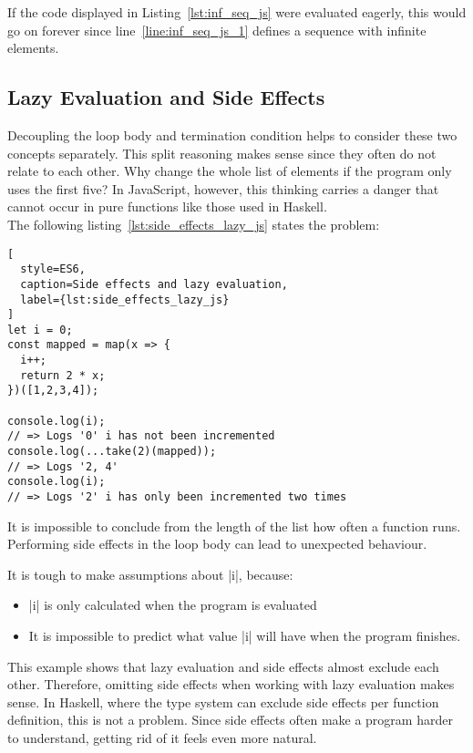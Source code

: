If the code displayed in Listing~\ref{lst:inf_seq_js} were evaluated eagerly,
this would go on forever since line~\ref{line:inf_seq_js_1} defines a sequence
with infinite elements. \\ 

\subsection{Lazy Evaluation and Side Effects} %
\label{sub:Lazy Evaluation and Side Effects}
Decoupling the loop body and termination condition helps to consider these two
concepts separately. This split reasoning makes sense since they often do not
relate to each other. Why change the whole list of elements if the program only
uses the first five? In JavaScript, however, this thinking carries a danger
that cannot occur in pure functions like those used in Haskell. \\ 
The following listing~\ref{lst:side_effects_lazy_js} states the problem:

\begin{lstlisting}[
  style=ES6,
  caption=Side effects and lazy evaluation,
  label={lst:side_effects_lazy_js}
]
let i = 0;
const mapped = map(x => {
  i++;
  return 2 * x;
})([1,2,3,4]);

console.log(i);
// => Logs '0' i has not been incremented
console.log(...take(2)(mapped));
// => Logs '2, 4' 
console.log(i);
// => Logs '2' i has only been incremented two times
\end{lstlisting}

It is impossible to conclude from the length of the list how often a function
runs. Performing side effects in the loop body can lead to unexpected behaviour. 

It is tough to make assumptions about |i|, because:
\begin{itemize}
  \item |i| is only calculated when the program is evaluated
  \item It is impossible to predict what value |i| will have when the program
    finishes.
\end{itemize}
This example shows that lazy evaluation and side effects almost exclude each
other. Therefore, omitting side effects when working with lazy evaluation makes
sense. In Haskell, where the type system can exclude side effects per function
definition, this is not a problem. Since side effects often make a program
harder to understand, getting rid of it feels even more natural.

